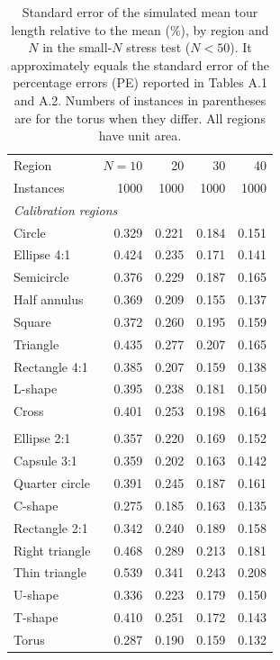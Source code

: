 \begin{table}[htbp]
\centering
\caption{Standard error of the simulated mean tour length relative to the mean (\%), by region and $N$ in the small-$N$ stress test ($N < 50$). It approximately equals the standard error of the percentage errors (PE) reported in Tables A.1 and A.2. Numbers of instances in parentheses are for the torus when they differ. All regions have unit area.}
\label{tab:sim_variability_smallN}
\footnotesize
\begin{tabular}{lrrrr}
\toprule
Region & $N = 10$ & 20 & 30 & 40 \\
Instances & 1000 & 1000 & 1000 & 1000 \\
\midrule
\multicolumn{5}{l}{\textit{Calibration regions}} \\
\quad Circle & 0.329 & 0.221 & 0.184 & 0.151 \\
\quad Ellipse 4:1 & 0.424 & 0.235 & 0.171 & 0.141 \\
\quad Semicircle & 0.376 & 0.229 & 0.187 & 0.165 \\
\quad Half annulus & 0.369 & 0.209 & 0.155 & 0.137 \\
\quad Square & 0.372 & 0.260 & 0.195 & 0.159 \\
\quad Triangle & 0.435 & 0.277 & 0.207 & 0.165 \\
\quad Rectangle 4:1 & 0.385 & 0.207 & 0.159 & 0.138 \\
\quad L-shape & 0.395 & 0.238 & 0.181 & 0.150 \\
\quad Cross & 0.401 & 0.253 & 0.198 & 0.164 \\
\addlinespace[2pt]
\multicolumn{5}{l}{\textit{Validation regions}} \\
\quad Ellipse 2:1 & 0.357 & 0.220 & 0.169 & 0.152 \\
\quad Capsule 3:1 & 0.359 & 0.202 & 0.163 & 0.142 \\
\quad Quarter circle & 0.391 & 0.245 & 0.187 & 0.161 \\
\quad C-shape & 0.275 & 0.185 & 0.163 & 0.135 \\
\quad Rectangle 2:1 & 0.342 & 0.240 & 0.189 & 0.158 \\
\quad Right triangle & 0.468 & 0.289 & 0.213 & 0.181 \\
\quad Thin triangle & 0.539 & 0.341 & 0.243 & 0.208 \\
\quad U-shape & 0.336 & 0.223 & 0.179 & 0.150 \\
\quad T-shape & 0.410 & 0.251 & 0.172 & 0.143 \\
\addlinespace[2pt]
\quad Torus & 0.287 & 0.190 & 0.159 & 0.132 \\
\bottomrule
\end{tabular}
\end{table}
